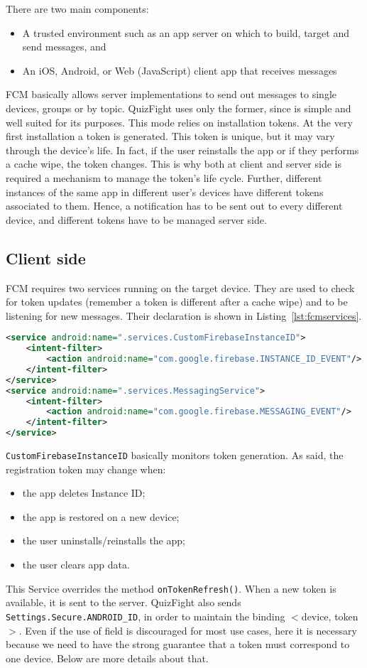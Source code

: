 There are two main components:
\begin{itemize}
	\item A trusted environment such as an app server on which to build, target and send messages, and
	\item An iOS, Android, or Web (JavaScript) client app that receives messages
\end{itemize}
FCM basically allows server implementations to send out messages to single devices, groups or by topic. QuizFight uses only the former, since is simple and well suited for its purposes. This mode relies on installation tokens. At the very first installation a token is generated. This token is unique, but it may vary through the device's life. In fact, if the user reinstalls the app or if they performs a cache wipe, the token changes. This is why both at client and server side is required a mechanism to manage the token's life cycle. Further, different instances of the same app in different user's devices have different tokens associated to them. Hence, a notification has to be sent out to every different device, and different tokens have to be managed server side.

\subsection{Client side}
FCM requires two services running on the target device. They are used to check for token updates (remember a token is different after a cache wipe) and to be listening for new messages. Their declaration is shown in Listing~\ref{lst:fcmservices}.
\begin{lstlisting}[language=xml, caption={FCM Services}, label={lst:fcmservices}]
<service android:name=".services.CustomFirebaseInstanceID">
	<intent-filter>
		<action android:name="com.google.firebase.INSTANCE_ID_EVENT"/>
	</intent-filter>
</service>
<service android:name=".services.MessagingService">
	<intent-filter>
		<action android:name="com.google.firebase.MESSAGING_EVENT"/>
	</intent-filter>
</service>
\end{lstlisting}

\texttt{CustomFirebaseInstanceID} basically monitors token generation. As said, the registration token may change when:
\begin{itemize}
	\item the app deletes Instance ID;
	\item the app is restored on a new device;
	\item the user uninstalls/reinstalls the app;
	\item the user clears app data.
\end{itemize}
This Service overrides the method \texttt{onTokenRefresh()}. When a new token is available, it is sent to the server. QuizFight also sends \\\texttt{Settings.Secure.ANDROID\_ID}, in order to maintain the binding $<$device, token$>$. Even if the use of field is discouraged for most use cases, here it is necessary because we need to have the strong guarantee that a token must correspond to one device. Below are more details about that.

